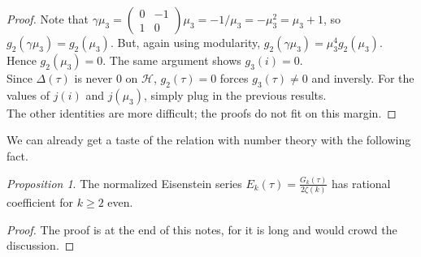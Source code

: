 \documentclass[11pt]{article}
\theoremstyle{definition}
\theoremstyle{example}
\theoremstyle{remark}
\theoremstyle{lemma}
\theoremstyle{proposition}
\newtheorem{proposition}{Proposition}[section]
\theoremstyle{Problem}
\theoremstyle{Solution}
\theoremstyle{theorem}
\theoremstyle{corollary}
\begin{document}
\begin{proof}
Note that $ \gamma\mu_3=\begin{pmatrix}
0 & -1 \\
1 & 0
\end{pmatrix} \mu_3 = -1/\mu_3 = -\mu_3^2=\mu_3+1$, so $g_2(\gamma \mu_3) = g_2(\mu_3)$. But, again using modularity, $g_2(\gamma\mu_3) = \mu_3^4g_2(\mu_3)$. Hence $g_2(\mu_3) = 0$. The same argument shows $g_3(i) = 0$.\\
Since $\Delta(\tau)$ is never $0$ on $\mathcal{H}$, $g_2(\tau) = 0$ forces $g_3(\tau)\neq 0$ and inversly. For the values of $j(i)$ and $j(\mu_3)$, simply plug in the previous results.\\
The other identities are more difficult; the proofs do not fit on this margin.
\end{proof}

We can already get a taste of the relation with number theory with the following fact.
\begin{proposition}
The normalized Eisenstein series $E_k(\tau) = \frac{G_k(\tau)}{2\zeta(k)}$ has rational coefficient for $k\geq 2$ even.
\end{proposition}
\begin{proof}
The proof is at the end of this notes, for it is long and would crowd the discussion.
\end{proof}
\end{document}
